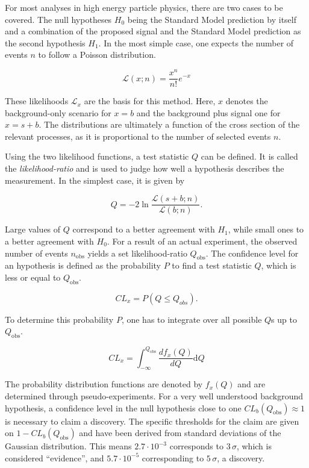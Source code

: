 For most analyses in high energy particle physics, there are two cases to be covered. The null hypotheses $H_0$ being the Standard Model prediction by itself and a combination of the proposed signal and the Standard Model prediction as the second hypothesis $H_1$. In the most simple case, one expects the number of events $n$ to follow a Poisson distribution.

\begin{equation}
  \label{eq:poisson-likelihood}
    \mathcal{L} (x; n) = \frac{x^n}{n!} e^{-x}
\end{equation}

\noindent These likelihoods $\mathcal{L}_x$ are the basis for this method. Here, $x$ denotes the background-only scenario for $x = b$ and the background plus signal one for $x = s + b$. The distributions are ultimately a function of the cross section of the relevant processes, as it is proportional to the number of selected events $n$.

Using the two likelihood functions, a test statistic $Q$ can be defined. It is called the \textit{likelihood-ratio} and is used to judge how well a hypothesis describes the measurement. In the simplest case, it is given by

\begin{equation}
  \label{eq:testq}
  Q = -2 \ln{ \frac{\mathcal{L} (s + b; n)}{\mathcal{L} (b; n)} }.
\end{equation}

\noindent Large values of $Q$ correspond to a better agreement with $H_1$, while small ones to a better agreement with $H_0$. For a result of an actual experiment, the observed number of events $n_{\text{obs}}$ yields a set likelihood-ratio $Q_{\text{obs}}$. The confidence level for an hypothesis is defined as the probability $P$ to find a test statistic $Q$, which is less or equal to $Q_{\text{obs}}$. 

\begin{equation}
  \label{eq:cl-prob}
  CL_x = P (Q \leq Q_{obs}).
\end{equation}

To determine this probability $P$, one has to integrate over all possible $Q$s up to $Q_{\text{obs}}$.

\begin{equation}
  \label{eq:clx}
  CL_x = \int^{Q_{\text{obs}}}_{-\infty} \frac{d f_x(Q)}{d Q} \text{d} Q
\end{equation}

\noindent The probability distribution functions are denoted by $f_x(Q)$ and are determined through pseudo-experiments. For a very well understood background hypothesis, a confidence level in the null hypothesis close to one $CL_b (Q_{\text{obs}}) \approx 1$ is necessary to claim a discovery. The specific thresholds for the claim are given on $1 - CL_b (Q_{\text{obs}})$ and have been derived from standard deviations of the Gaussian distribution. This means $2.7 \cdot 10^{-3}$ corresponds to $3\,\sigma$, which is considered ``evidence'', and $5.7 \cdot 10^{-5}$ corresponding to $5\,\sigma$, a discovery.

